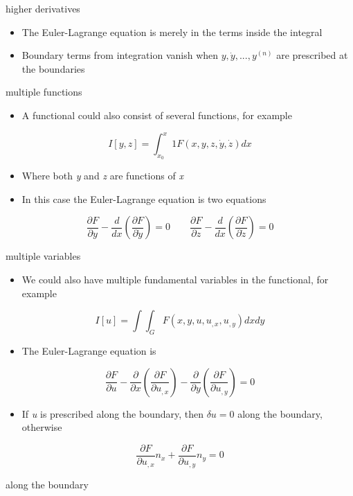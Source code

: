 \documentclass[
  letterpaper,
  ignorenonframetext,
  aspectratio=43,
  handout,
  12pt]{beamer}
\providecommand{\tightlist}{%
  \setlength{\itemsep}{0pt}\setlength{\parskip}{0pt}}
\providecommand{\tightlist}{%
\setlength{\itemsep}{0pt}\setlength{\parskip}{0pt}}
\begin{document}
\begin{frame}{higher derivatives}
\protect\hypertarget{higher-derivatives-1}{}
\begin{itemize}
\tightlist
\item
  The Euler-Lagrange equation is merely in the terms inside the integral
\item
  Boundary terms from integration vanish when
  \(y, \dot{y}, ... , y^{(n)}\) are prescribed at the boundaries
\end{itemize}
\end{frame}

\begin{frame}{multiple functions}
\protect\hypertarget{multiple-functions}{}
\begin{itemize}
\tightlist
\item
  A functional could also consist of several functions, for example
\end{itemize}

\[I[y,z] = \int_{x_0}^x{1} F(x,y,z,\dot{y},\dot{z})dx\]

\begin{itemize}
\tightlist
\item
  Where both \emph{y} and \emph{z} are functions of \emph{x}
\item
  In this case the Euler-Lagrange equation is two equations
\end{itemize}

\[\frac{\partial F}{\partial y} - \frac{d}{dx}\left(\frac{\partial F}{\partial \dot{y}}\right) = 0 \qquad \frac{\partial F}{\partial z} - \frac{d}{dx}\left(\frac{\partial F}{\partial \dot{z}}\right) = 0\]
\end{frame}

\begin{frame}{multiple variables}
\protect\hypertarget{multiple-variables-1}{}
\begin{itemize}
\tightlist
\item
  We could also have multiple fundamental variables in the functional,
  for example
\end{itemize}

\[I [u] = \int \int_G F(x, y, u, u_{,x}, u_{,y}) dx dy\]

\begin{itemize}
\tightlist
\item
  The Euler-Lagrange equation is
\end{itemize}

\[\frac{\partial F}{\partial u} - \frac{\partial}{\partial x} \left( \frac{\partial F}{\partial u_{,x}} \right) - \frac{\partial}{\partial y} \left( \frac{\partial F}{\partial u_{,y}}\right) = 0\]

\begin{itemize}
\tightlist
\item
  If \emph{u} is prescribed along the boundary, then \(\delta u = 0\)
  along the boundary, otherwise
\end{itemize}

\[\frac{\partial F}{\partial u_{,x}} n_x + \frac{\partial F}{\partial u_{,y}} n_y = 0\]

along the boundary
\end{frame}
\end{document}
